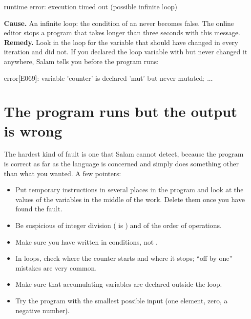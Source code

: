 \begin{plainout}
runtime error: execution timed out (possible infinite loop)
\end{plainout}

\textbf{Cause.} An infinite loop: the condition of an  never
becomes false. The online editor stops a program that takes longer than
three seconds with this message.
\textbf{Remedy.} Look in the loop for the variable that should have changed
in every iteration and did not. If you declared the loop variable with
 but never changed it anywhere, Salam tells you before the program
runs:

\begin{plainout}
error[E069]: variable 'counter' is declared 'mut' but never mutated; ...
\end{plainout}

\section*{The program runs but the output is wrong}

The hardest kind of fault is one that Salam cannot detect, because the
program is correct as far as the language is concerned and simply does
something other than what you wanted. A few pointers:
\begin{itemize}
  \item Put temporary  instructions in several places in the
        program and look at the values of the variables in the middle of
        the work. Delete them once you have found the fault.
  \item Be suspicious of integer division ( is ) and of
        the order of operations.
  \item Make sure you have written \code{==} in conditions, not \code{=}.
  \item In loops, check where the counter starts and where it stops;
        ``off by one'' mistakes are very common.
  \item Make sure that accumulating variables are declared outside the
        loop.
  \item Try the program with the smallest possible input (one element,
        zero, a negative number).
\end{itemize}
